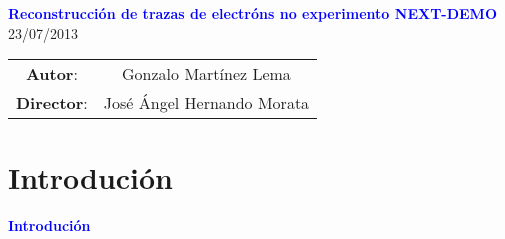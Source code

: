 \documentclass[10pt]{beamer}
\newcommand{\azul}[1]{\textcolor{blue}{#1}}
\begin{document}

\begin{frame}

\vspace{2cm}
\begin{center}\Large
{\bf\azul{Reconstrucción de trazas de electróns no experimento NEXT-DEMO}}\\ \normalsize
\vspace{1cm}
23/07/2013\\
\vspace{1cm}
\begin{tabular}{cc}
{\small{\bf Autor}}: & {Gonzalo Martínez Lema}\\
{\small{\bf Director}}: & {José Ángel Hernando Morata}
\end{tabular}
\end{center}

\end{frame}

\begin{frame}%
\tableofcontents
\end{frame}

\section{Introdución}

\begin{frame}
\begin{center}
{\bf\azul{Introdución}}
\end{center}
\end{frame}
\end{document}

